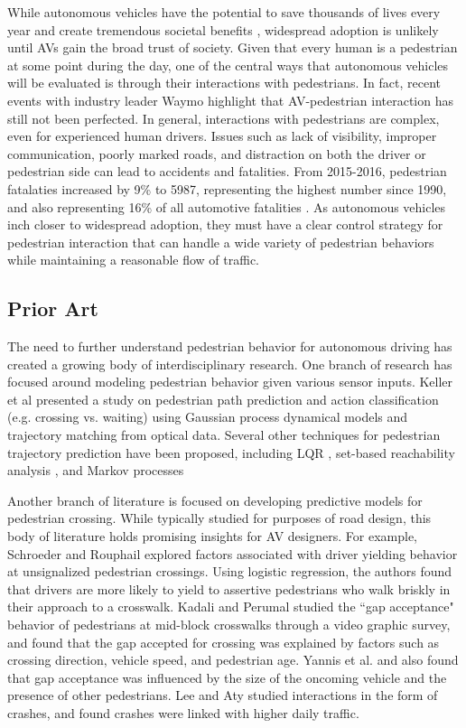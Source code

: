 \documentclass[letterpaper, 10 pt, conference]{ieeeconf}  %
\begin{document}
While autonomous vehicles have the potential to save thousands of lives every year and create tremendous societal benefits \cite{Fagnant2015}, widespread adoption is unlikely until AVs gain the broad trust of society. Given that every human is a pedestrian at some point during the day, one of the central ways that autonomous vehicles will be evaluated is through their interactions with pedestrians. In fact, recent events with industry leader Waymo highlight that AV-pedestrian interaction has still not been perfected\cite{MattRichtelandConorDougherty2015}. In general, interactions with pedestrians are complex, even for experienced human drivers. Issues such as lack of visibility, improper communication, poorly marked roads, and distraction on both the driver or pedestrian side can lead to accidents and fatalities. From 2015-2016, pedestrian fatalaties increased by 9\% to 5987, representing the highest number since 1990, and also representing 16\% of all automotive fatalities \cite{HighwayTrafficSafetyAdministration2016}. As autonomous vehicles inch closer to widespread adoption, they must have a clear control strategy for pedestrian interaction that can handle a wide variety of pedestrian behaviors while maintaining a reasonable flow of traffic.    

\subsection{Prior Art}

The need to further understand pedestrian behavior for autonomous driving has created a growing body of interdisciplinary research. One branch of research has focused around modeling pedestrian behavior given various sensor inputs. Keller et al \cite{Keller2014} presented a study on pedestrian path prediction and action classification (e.g. crossing vs. waiting) using Gaussian process dynamical models and trajectory matching from optical data. Several other techniques for pedestrian trajectory prediction have been proposed, including LQR \cite{Batkovic}, set-based reachability analysis \cite{Koschi2018}, and Markov processes \cite{Karasev2016} 

Another branch of literature is focused on developing predictive models for pedestrian crossing. While typically studied for purposes of road design, this body of literature holds promising insights for AV designers. For example, Schroeder and Rouphail \cite{Schroeder2011} explored factors associated with driver yielding behavior at unsignalized pedestrian crossings. Using logistic regression, the authors found that drivers are more likely to yield to assertive pedestrians who walk briskly in their approach to a crosswalk. Kadali and Perumal \cite{RaghuramKadali2012} studied the ``gap acceptance" behavior of pedestrians at mid-block crosswalks through a video graphic survey, and found that the gap accepted for crossing was explained by factors such as crossing direction, vehicle speed, and pedestrian age. Yannis et al. \cite{Yannis2013} and \cite{Sun2002} also found that gap acceptance was influenced by the size of the oncoming vehicle and the presence of other pedestrians.  Lee and Aty \cite{Lee2005} studied interactions in the form of crashes, and found crashes were linked with higher daily traffic. 
\end{document}
